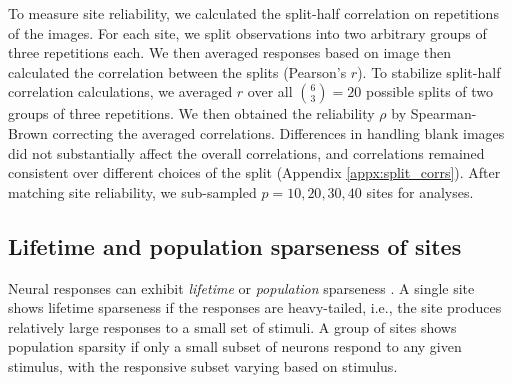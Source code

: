 \documentclass[draft]{cmustatproposal} %
\newcommand{\todo}[1]{{\color{purple}#1}}
\begin{document}
To measure site reliability, we calculated the split-half correlation on repetitions of the images. For each site, we split observations into two arbitrary groups of three repetitions each. We then averaged responses based on image then calculated the correlation between the splits (Pearson's \( r \)). To stabilize split-half correlation calculations, we averaged \( r \) over all \( \binom{6}{3} = 20 \) possible splits of two groups of three repetitions. We then obtained the reliability \( \rho \) by Spearman-Brown correcting the averaged correlations. Differences in handling blank images did not substantially affect the overall correlations, and correlations remained consistent over different choices of the split (Appendix \ref{appx:split_corrs}).  \todo{After matching site reliability, we sub-sampled \( p = 10, 20, 30, 40 \) sites for analyses.}

\subsection{Lifetime and population sparseness of sites}

Neural responses can exhibit \textit{lifetime} or \textit{population} sparseness \cite{willmore_characterizing_2001}. A single site shows lifetime sparseness if the responses are heavy-tailed, i.e., the site produces relatively large responses to a small set of stimuli. A group of sites shows population sparsity if only a small subset of neurons respond to any given stimulus, with the responsive subset varying based on stimulus. 
\end{document}
